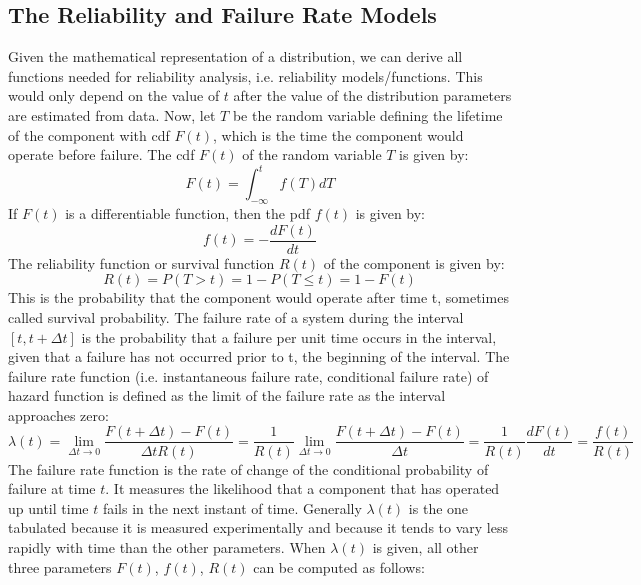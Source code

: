 \subsection{The Reliability and Failure Rate Models}
Given the mathematical representation of a distribution, we can derive all functions needed
for reliability analysis, i.e. reliability models/functions. This would only depend on the value of $t$
after the value of the distribution parameters are estimated from data.
Now, let $T$ be the random variable defining the lifetime of the component with cdf $F(t)$, which is the
time the component would operate before failure. The cdf $F(t)$ of the random variable $T$ is given by:
\begin{equation}
  F(t) = \int_{-\infty}^{t} f(T)dT
\end{equation}
If $F(t)$ is a differentiable function, then the pdf $f(t)$ is given by:
\begin{equation}
  f(t) = - \frac{dF(t)}{dt}
\end{equation}
The reliability function or survival function $R(t)$ of the component is given by:
\begin{equation}
  R(t) = P(T>t) = 1 - P(T\leq t) = 1-F(t)
\end{equation}
This is the probability that the component would operate after time t, sometimes called survival probability.
The failure rate of a system during the interval $[t,t+\Delta t]$ is the probability that a failure per
unit time occurs in the interval, given that a failure has not occurred prior to t, the beginning of the
interval. The failure rate function (i.e. instantaneous failure rate, conditional failure rate) of hazard
function is defined as the limit of the failure rate as the interval approaches zero:
\begin{equation}
  \lambda (t)= \lim_{\Delta t\rightarrow 0} \frac{F(t+\Delta t) - F(t)}{\Delta tR(t)}
	 = \frac{1}{R(t)} \lim_{\Delta t\rightarrow 0} \frac{F(t+\Delta t) - F(t)}{\Delta t}
	 = \frac{1}{R(t)}\frac{dF(t)}{dt} = \frac{f(t)}{R(t)}
\end{equation}
The failure rate function is the rate of change of the conditional probability of failure at time $t$.
It measures the likelihood that a component that has operated up until time $t$ fails in the next
instant of time.
Generally $\lambda (t)$ is the one tabulated because it is measured experimentally and because it tends to
vary less rapidly with time than the other parameters. When $\lambda (t)$ is given, all other three
parameters $F(t)$, $f(t)$, $R(t)$ can be computed as follows:
